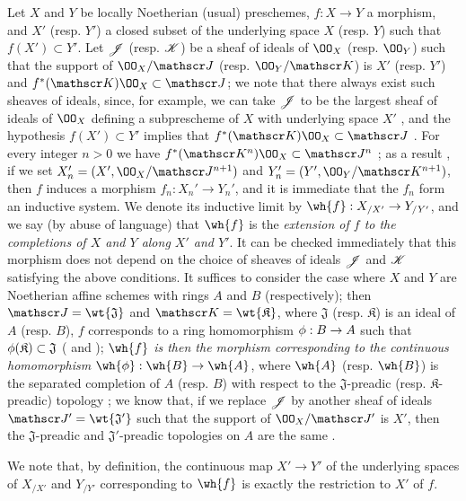 \begin{env}[10.9.1]
\label{1.10.9.1}
Let $X$ and $Y$ be locally Noetherian (usual) preschemes, $f:X\to Y$ a morphism, and $X'$ (resp. $Y'$) a closed subset of the underlying space $X$ (resp. $Y$) such that $f(X')\subset Y'$.
Let $\mathscr{J}$ (resp. $\mathscr{K}$) be a sheaf of ideals of $\OO_X$ (resp. $\OO_Y$) such that the support of $\OO_X/\sh{J}$ (resp. $\OO_Y/\sh{K}$) is $X'$ (resp. $Y'$) and $f^*(\sh{K})\OO_X\subset\sh{J}$; we note that there always exist such sheaves of ideals, since, for example, we can take $\mathscr{J}$ to be the largest sheaf of ideals of $\OO_X$ defining a subprescheme of $X$ with underlying space $X'$ , and the hypothesis $f(X')\subset Y'$ implies that $f^*(\sh{K})\OO_X\subset\sh{J}$ .
For every integer $n>0$ we have $f^*(\sh{K}^n)\OO_X\subset\sh{J}^n$ ; as a result , if we set $X_n'=(X',\OO_X/\sh{J}^{n+1})$ and $Y_n'=(Y',\OO_Y/\sh{K}^{n+1})$, then $f$ induces a morphism $f_n:X_n'\to Y_n'$, and it is immediate that the $f_n$ form an inductive system.
We denote its inductive limit  by $\wh{f}:X_{/X'}\to Y_{/Y'}$, and we say (by abuse of language) that $\wh{f}$ is the \emph{extension of $f$ to the completions of $X$ and $Y$ along $X'$ and $Y'$}.
It can be checked immediately that this morphism does not depend on the choice of sheaves of ideals $\mathscr{J}$ and $\mathscr{K}$ satisfying the above conditions.
It suffices to consider the case where $X$ and $Y$ are Noetherian affine schemes with rings $A$ and $B$ (respectively); then $\sh{J}=\wt{\mathfrak{J}}$ and $\sh{K}=\wt{\mathfrak{K}}$, where $\mathfrak{J}$ (resp. $\mathfrak{K}$) is an ideal of $A$ (resp. $B$), $f$ corresponds to a ring homomorphism $\vphi:B\to A$ such that $\phi(\mathfrak{K})\subset\mathfrak{J}$ ( and ); \emph{$\wh{f}$ is then the morphism corresponding  to the continuous homomorphism $\wh{\vphi}:\wh{B}\to\wh{A}$}, where $\wh{A}$ (resp. $\wh{B}$) is the separated completion of $A$ (resp. $B$) with respect to the $\mathfrak{J}$-preadic (resp. $\mathfrak{K}$-preadic) topology ; we know that, if we replace $\mathscr{J}$ by another
sheaf of ideals $\sh{J}'=\wt{\mathfrak{J}'}$ such that the support of $\OO_X/\sh{J}'$ is $X'$, then the $\mathfrak{J}$-preadic and $\mathfrak{J}'$-preadic topologies on $A$ are the same .

We note that, by definition, the continuous map $X'\to Y'$ of the underlying spaces of $X_{/X'}$ and $Y_{/Y'}$ corresponding to $\wh{f}$ is exactly the restriction to $X'$ of $f$.
\end{env}

